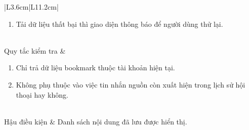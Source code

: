 \documentclass[12pt,a4paper,oneside]{report}
\begin{document}
{\begin{longtable}{|L{3.6cm}|L{11.2cm}|}
\begin{enumerate}[leftmargin=*,nosep]
                            \item Tải dữ liệu thất bại thì giao diện thông báo để người dùng thử lại.
                          \end{enumerate}               \\
    \hline
    Quy tắc kiểm tra    & \begin{enumerate}[leftmargin=*,nosep]
                            \item Chỉ trả dữ liệu bookmark thuộc tài khoản hiện tại.
                            \item Không phụ thuộc vào việc tin nhắn nguồn còn xuất hiện trong lịch sử hội thoại hay không.
                          \end{enumerate} \\
    \hline
    Hậu điều kiện       & Danh sách nội dung đã lưu được hiển thị.                                                      \\
    \hline
  \end{longtable}
}
\end{document}
